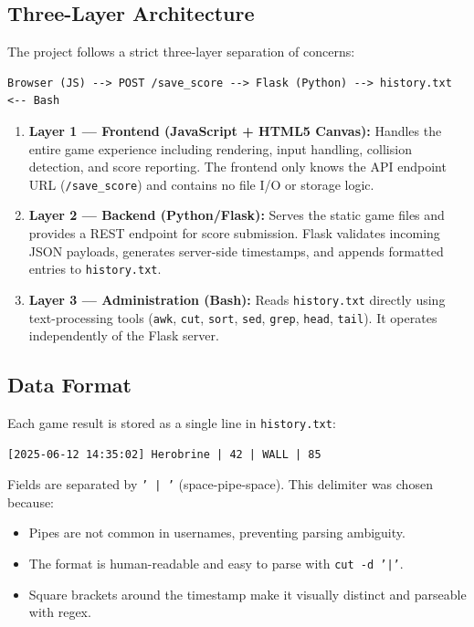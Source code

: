 \documentclass[12pt,a4paper]{article}
\begin{document}
\subsection{Three-Layer Architecture}

The project follows a strict three-layer separation of concerns:

\begin{lstlisting}
Browser (JS) --> POST /save_score --> Flask (Python) --> history.txt <-- Bash
\end{lstlisting}

\begin{enumerate}
    \item \textbf{Layer 1 --- Frontend (JavaScript + HTML5 Canvas):} Handles the entire game experience including rendering, input handling, collision detection, and score reporting. The frontend only knows the API endpoint URL (\texttt{/save\_score}) and contains no file I/O or storage logic.

    \item \textbf{Layer 2 --- Backend (Python/Flask):} Serves the static game files and provides a REST endpoint for score submission. Flask validates incoming JSON payloads, generates server-side timestamps, and appends formatted entries to \texttt{history.txt}.

    \item \textbf{Layer 3 --- Administration (Bash):} Reads \texttt{history.txt} directly using text-processing tools (\texttt{awk}, \texttt{cut}, \texttt{sort}, \texttt{sed}, \texttt{grep}, \texttt{head}, \texttt{tail}). It operates independently of the Flask server.
\end{enumerate}

\subsection{Data Format}

Each game result is stored as a single line in \texttt{history.txt}:

\begin{lstlisting}
[2025-06-12 14:35:02] Herobrine | 42 | WALL | 85
\end{lstlisting}

Fields are separated by \texttt{' | '} (space-pipe-space). This delimiter was chosen because:
\begin{itemize}
    \item Pipes are not common in usernames, preventing parsing ambiguity.
    \item The format is human-readable and easy to parse with \texttt{cut -d '|'}.
    \item Square brackets around the timestamp make it visually distinct and parseable with regex.
\end{itemize}
\end{document}
